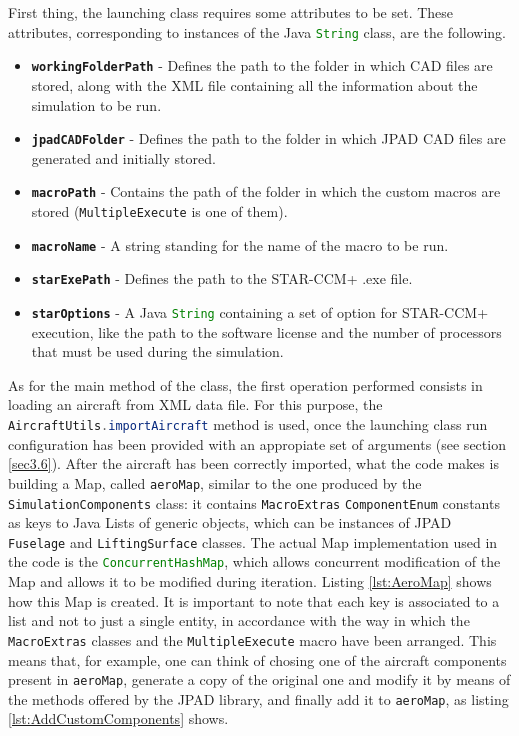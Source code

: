 \bigskip
\noindent
First thing, the launching class requires some attributes to be set. These attributes, corresponding to instances of the Java \lstinline[language=Java]!String! class, are the following.
%
\begin{itemize}
\renewcommand\labelitemi{\tiny$\blacksquare$}
\item \textbf{\lstinline[language=Java]!workingFolderPath!} - Defines the path to the folder in which \gls{CAD} files are stored, along with the XML file containing all the information about the simulation to be run.
\item \textbf{\lstinline[language=Java]!jpadCADFolder!} - Defines the path to the folder in which \gls{JPAD} \gls{CAD} files are generated and initially stored.
\item \textbf{\lstinline[language=Java]!macroPath!} - Contains the path of the folder in which the custom macros are stored (\lstinline[language=Java]!MultipleExecute! is one of them).
\item \textbf{\lstinline[language=Java]!macroName!} - A string standing for the name of the macro to be run.
\item \textbf{\lstinline[language=Java]!starExePath!} - Defines the path to the STAR-CCM+ .exe file.
\item \textbf{\lstinline[language=Java]!starOptions!} - A Java \lstinline[language=Java]!String! containing a set of option for STAR-CCM+ execution, like the path to the software license and the number of processors that must be used during the simulation.
\end{itemize}
%
As for the main method of the class, the first operation performed consists in loading an aircraft from XML data file. For this purpose, the \lstinline[language=Java]!AircraftUtils.importAircraft! method is used, once the launching class run configuration has been provided with an appropiate set of arguments (see section \ref{sec3.6}). After the aircraft has been correctly imported, what the code makes is building a \gls{Map}, called \lstinline[language=Java]!aeroMap!, similar to the one produced by the \lstinline[language=Java]!SimulationComponents! class: it contains \lstinline[language=Java]!MacroExtras! \lstinline[language=Java]!ComponentEnum! constants as keys to Java \gls{List}s of generic objects, which can be instances of \gls{JPAD} \lstinline[language=Java]!Fuselage! and \lstinline[language=Java]!LiftingSurface! classes. The actual \gls{Map} implementation used in the code is the \lstinline[language=Java]!ConcurrentHashMap!, which allows concurrent modification of the \gls{Map} and allows it to be modified during iteration. Listing \ref{lst:AeroMap} shows how this \gls{Map} is created. It is important to note that each key is associated to a list and not to just a single entity, in accordance with the way in which the \lstinline[language=Java]!MacroExtras! classes and the \lstinline[language=Java]!MultipleExecute! macro have been arranged. This means that, for example, one can think of chosing one of the aircraft components present in \lstinline[language=Java]!aeroMap!, generate a copy of the original one and modify it by means of the methods offered by the \gls{JPAD} library, and finally add it to \lstinline[language=Java]!aeroMap!, as listing \ref{lst:AddCustomComponents} shows.

